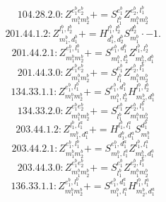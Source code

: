 \documentclass[letterpaper,10pt,fleqn,leqno,onecolumn]{article}
\begin{document}
\begin{equation} \;\;\;\;\;\;  104.28.2.0: Z^{e_{1}^{b}e_{2}^{b}}_{m_{1}^{b}m_{2}^{b}}+=S^{e_{1}^{b}}_{l_{1}^{b}}Z^{e_{2}^{b},l_{1}^{b}}_{m_{1}^{b}m_{2}^{b}} \end{equation}
\begin{equation} \;\;\;\;\;\;  201.44.1.2: Z^{l_{1}^{b},l_{2}^{b}}_{m_{1}^{b},d_{1}^{b}}+=H^{l_{1}^{b},l_{2}^{b}}_{d_{1}^{b},d_{2}^{b}}S^{d_{2}^{b}}_{m_{1}^{b}}\cdot -1. \end{equation}
\begin{equation} \;\;\;\;\;\;  201.44.2.1: Z^{e_{1}^{b},l_{1}^{b}}_{m_{1}^{b}m_{2}^{b}}+=S^{e_{1}^{b},d_{1}^{b}}_{m_{1}^{b},l_{2}^{b}}Z^{l_{1}^{b},l_{2}^{b}}_{m_{2}^{b},d_{1}^{b}} \end{equation}
\begin{equation} \;\;\;\;\;\;  201.44.3.0: Z^{e_{1}^{b}e_{2}^{b}}_{m_{1}^{b}m_{2}^{b}}+=S^{e_{1}^{b}}_{l_{1}^{b}}Z^{e_{2}^{b},l_{1}^{b}}_{m_{1}^{b}m_{2}^{b}} \end{equation}
\begin{equation} \;\;\;\;\;\;  134.33.1.1: Z^{e_{1}^{b},l_{1}^{b}}_{m_{1}^{b}m_{2}^{b}}+=S^{e_{1}^{b},d_{1}^{b}}_{m_{1}^{b},l_{2}^{b}}H^{l_{1}^{b},l_{2}^{b}}_{m_{2}^{b},d_{1}^{b}} \end{equation}
\begin{equation} \;\;\;\;\;\;  134.33.2.0: Z^{e_{1}^{b}e_{2}^{b}}_{m_{1}^{b}m_{2}^{b}}+=S^{e_{1}^{b}}_{l_{1}^{b}}Z^{e_{2}^{b},l_{1}^{b}}_{m_{1}^{b}m_{2}^{b}} \end{equation}
\begin{equation} \;\;\;\;\;\;  203.44.1.2: Z^{l_{1}^{b},l_{1}^{a}}_{m_{1}^{b},d_{1}^{a}}+=H^{l_{1}^{b},l_{1}^{a}}_{d_{1}^{b},d_{1}^{a}}S^{d_{1}^{b}}_{m_{1}^{b}} \end{equation}
\begin{equation} \;\;\;\;\;\;  203.44.2.1: Z^{e_{1}^{b},l_{1}^{b}}_{m_{1}^{b}m_{2}^{b}}+=S^{e_{1}^{b},d_{1}^{a}}_{m_{1}^{b},l_{1}^{a}}Z^{l_{1}^{b},l_{1}^{a}}_{m_{2}^{b},d_{1}^{a}} \end{equation}
\begin{equation} \;\;\;\;\;\;  203.44.3.0: Z^{e_{1}^{b}e_{2}^{b}}_{m_{1}^{b}m_{2}^{b}}+=S^{e_{1}^{b}}_{l_{1}^{b}}Z^{e_{2}^{b},l_{1}^{b}}_{m_{1}^{b}m_{2}^{b}} \end{equation}
\begin{equation} \;\;\;\;\;\;  136.33.1.1: Z^{e_{1}^{b},l_{1}^{b}}_{m_{1}^{b}m_{2}^{b}}+=S^{e_{1}^{b},d_{1}^{a}}_{m_{1}^{b},l_{1}^{a}}H^{l_{1}^{b},l_{1}^{a}}_{m_{2}^{b},d_{1}^{a}} \end{equation}
\end{document}
